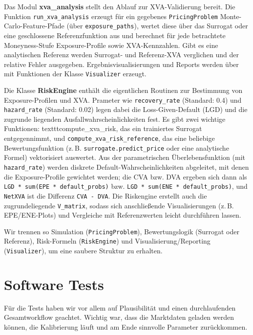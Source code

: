 \documentclass{book}
\begin{document}
Das Modul \textbf{xva\_analysis} stellt den Ablauf zur XVA-Validierung bereit. 
Die Funktion \texttt{run\_xva\_analysis} erzeugt für ein gegebenes \texttt{PricingProblem} Monte-Carlo-Feature-Pfade (über \texttt{exposure\_paths}), 
wertet diese über das Surrogat oder eine geschlossene Referenzfunktion aus und berechnet für jede betrachtete Moneyness-Stufe Exposure-Profile sowie XVA-Kennzahlen. 
Gibt es eine analytischen Referenz werden Surrogat- und Referenz-XVA verglichen und der relative Fehler ausgegeben. 
Ergebnisvisualisierungen und Reports werden über mit Funktionen der Klasse \texttt{Visualizer} erzeugt.

Die Klasse \textbf{RiskEngine} enthält die eigentlichen Routinen zur Bestimmung von Exposure-Profilen und XVA. 
Prameter wie \texttt{recovery\_rate} (Standard: 0.4) und \texttt{hazard\_rate} (Standard: 0.02) legen dabei die Loss-Given-Default (LGD) und die zugrunde liegenden Ausfallwahrscheinlichkeiten fest. 
Es gibt zwei wichtige Funktionen: texttt{compute\_xva\_risk}, das ein trainiertes Surrogat entgegennimmt, und \texttt{compute\_xva\_risk\_reference}, das eine beliebige Bewertungsfunktion (z.\,B. \texttt{surrogate.predict\_price} oder eine analytische Formel) vektorisiert auswertet. 
Aus der parametrischen Überlebensfunktion (mit \texttt{hazard\_rate}) werden diskrete Default-Wahrscheinlichkeiten abgeleitet, mit denen die Exposure-Profile gewichtet werden; 
die CVA bzw. DVA ergeben sich dann als \texttt{LGD * sum(EPE * default\_probs)} bzw. \texttt{LGD * sum(ENE * default\_probs)}, und \texttt{NetXVA} ist die Differenz \texttt{CVA - DVA}. 
Die Riskengine erstellt auch die zugrundeliegende \texttt{V\_matrix}, sodass sich anschließende Visualisierungen (z.\,B. EPE/ENE-Plots) und Vergleiche mit Referenzwerten leicht durchführen lassen. 

Wir trennen so Simulation (\texttt{PricingProblem}), Bewertungslogik (Surrogat oder Referenz), Risk-Formeln (\texttt{RiskEngine}) und Visualisierung/Reporting (\texttt{Visualizer}), um eine saubere Struktur zu erhalten.

\section{Software Tests}

Für die Tests haben wir vor allem auf Plausibilität und einen durchlaufenden Gesamtworkflow geachtet. Wichtig war, dass die Marktdaten geladen werden können, die Kalibrierung läuft und am Ende sinnvolle Parameter zurückkommen.
\end{document}
